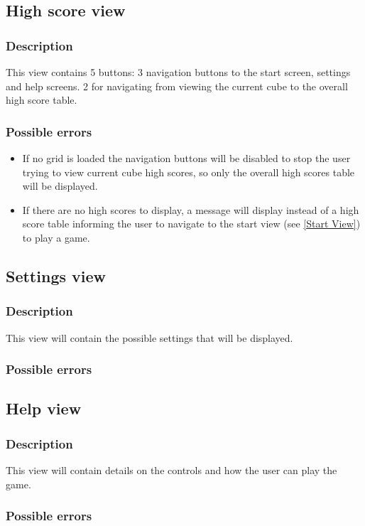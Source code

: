 \documentclass{project}
\begin{document}
\subsection{High score view} \label{High score View}
\subsubsection{Description}
This view contains 5 buttons: 3 navigation buttons to the start screen, settings and help screens. 2 for navigating from viewing the current cube to the overall high score table.
\subsubsection{Possible errors}
\begin{itemize}
\item If no grid is loaded the navigation buttons will be disabled to stop the user trying to view current cube high scores, so only the overall high scores table will be displayed.
\item If there are no high scores to display, a message will display instead of a high score table informing the user to navigate to the start view (see \ref{Start View}) to play a game.
\end{itemize}

\subsection{Settings view} \label{Settings View}
\subsubsection{Description}
This view will contain the possible settings that will be displayed.
\subsubsection{Possible errors}

\subsection{Help view} \label{Help View}
\subsubsection{Description}
This view will contain details on the controls and how the user can play the game.
\subsubsection{Possible errors}
\end{document}
